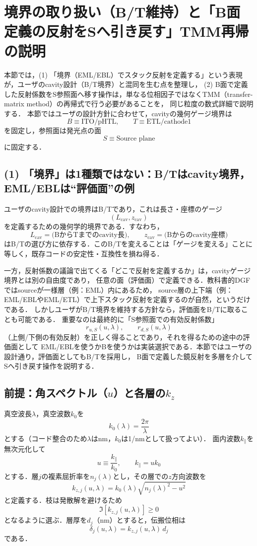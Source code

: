 \section{境界の取り扱い（B/T維持）と「B面定義の反射をSへ引き戻す」TMM再帰の説明}

本節では，(1) 「境界（EML/EBL）でスタック反射を定義する」という表現が，ユーザのcavity設計（B/T境界）と混同を生む点を整理し，
(2) B面で定義した反射係数をS参照面へ移す操作は，単なる位相因子ではなくTMM（transfer-matrix method）の再帰式で行う必要があることを，
同じ粒度の数式詳細で説明する．
本節ではユーザの設計方針に合わせて，cavityの幾何ゲージ境界は
\[
B \equiv \text{ITO/pHTL},\qquad T \equiv \text{ETL/cathode1}
\]
を固定し，参照面は発光点の面
\[
S \equiv \text{Source plane}
\]
に固定する．

\subsection{(1) 「境界」は1種類ではない：B/Tはcavity境界，EML/EBLは“評価面”の例}

ユーザのcavity設計での境界はB/Tであり，これは長さ・座標のゲージ
\[
(L_{\mathrm{cav}}, z_{\mathrm{cav}})
\]
を定義するための幾何学的境界である．すなわち，
\[
L_{\mathrm{cav}} = \text{(BからTまでのcavity長)},\qquad
z_{\mathrm{cav}} = \text{(Bからのcavity座標)}
\]
はB/Tの選び方に依存する．このB/Tを変えることは「ゲージを変える」ことに等しく，既存コードの安定性・互換性を損ね得る．

一方，反射係数の議論で出てくる「どこで反射を定義するか」は，cavityゲージ境界とは別の自由度であり，
任意の面（評価面）で定義できる．教科書的DGFではsourceが一様層（例：EML）内にあるため，
source層の上下端（例：EML/EBLやEML/ETL）で上下スタック反射を定義するのが自然，というだけである．
しかしユーザがB/T境界を維持する方針なら，評価面をB/Tに取ることも可能である．
重要なのは最終的に「S参照面での有効反射係数」
\[
r_{u,S}(u,\lambda),\qquad r_{d,S}(u,\lambda)
\]
（上側/下側の有効反射）を正しく得ることであり，それを得るための途中の評価面として
EML/EBLを使うかBを使うかは実装選択である．本節ではユーザの設計通り，評価面としてもB/Tを採用し，
B面で定義した鏡反射を多層を介してSへ引き戻す操作を説明する．

\subsection{前提：角スペクトル（$u$）と各層の$k_z$}

真空波長$\lambda$，真空波数$k_0$を
\[
k_0(\lambda)=\frac{2\pi}{\lambda}
\]
とする（コード整合のため$\lambda$はnm，$k_0$は1/nmとして扱ってよい）．
面内波数$k_\parallel$を無次元化して
\[
u \equiv \frac{k_\parallel}{k_0},\qquad k_\parallel = u k_0
\]
とする．層$j$の複素屈折率を$n_j(\lambda)$とし，その層での$z$方向波数を
\[
k_{z,j}(u,\lambda)=k_0(\lambda)\sqrt{n_j(\lambda)^2-u^2}
\]
と定義する．枝は発散解を避けるため
\[
\Im\!\left[k_{z,j}(u,\lambda)\right]\ge 0
\]
となるように選ぶ．層厚を$d_j$（nm）とすると，伝搬位相は
\[
\delta_j(u,\lambda)=k_{z,j}(u,\lambda)\,d_j
\]
である．

